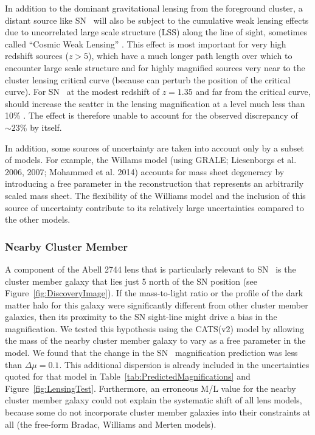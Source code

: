 In addition to the dominant gravitational lensing from the foreground
cluster, a distant source like SN \tomas\ will also be subject to the
cumulative weak lensing effects due to uncorrelated large scale
structure (LSS) along the line of sight, sometimes called ``Cosmic
Weak
Lensing'' \citep{Wong:2011,Host:2012,Collett:2013,Greene:2013,Bayliss:2014,McCully:2014,DAloisio:2014}.
This  effect is most important for very high redshift
sources ($z>5$), which have a much longer path length over which to
encounter large scale structure and for highly magnified sources very
near to the cluster lensing critical curve (because  can
perturb the position of the critical curve).  For SN \tomas\ at the
modest redshift of $z=1.35$ and far from the critical
curve,  should increase the scatter in the lensing
magnification at a level much less than 10\% \citep{DAloisio:2014}.
The  effect is therefore unable to account for the
observed discrepancy of $\sim23$\% by itself.

In addition, some sources of uncertainty are taken into account only by a
subset of models. For example, the Willams model (using GRALE;
Liesenborgs et al. 2006, 2007; Mohammed et al. 2014) accounts for mass
sheet degeneracy by introducing a free parameter in the reconstruction
that represents an arbitrarily scaled mass sheet. The flexibility of
the Williams model and the inclusion of this source of uncertainty
contribute to its relatively large uncertainties compared to the other
models.

\subsubsection{Nearby Cluster Member}
A component of the Abell 2744 lens that is particularly relevant to SN \tomas\ is the cluster member
galaxy that lies just 5 north of the SN position (see
Figure~\ref{fig:DiscoveryImage}).  If the mass-to-light ratio or the
profile of the dark matter halo for this galaxy were significantly
different from other cluster member galaxies, then its
proximity to the SN sight-line might drive a bias in the magnification.
We tested this hypothesis using the CATS(v2) model by allowing the mass
of the nearby cluster member galaxy to vary as a free parameter in the
model. We found that the change in the SN \tomas\ magnification
prediction was less than $\Delta\mu=0.1$.  This additional dispersion
is already included in the uncertainties quoted for that model in
Table~\ref{tab:PredictedMagnifications} and
Figure~\ref{fig:LensingTest}.  Furthermore, an erroneous M/L
value for the nearby cluster member galaxy could not explain the
systematic shift of all lens models, because some do not incorporate
cluster member galaxies into their constraints at all (the free-form
Bradac, Williams and Merten models).


